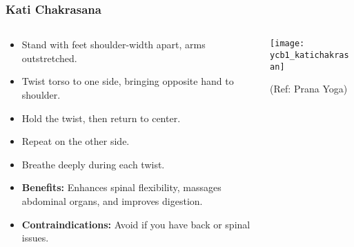 \begin{frame}[fragile]\frametitle{Kati Chakrasana}
\begin{columns}
    \begin{column}[T]{0.5\linewidth}
      \begin{itemize}
        \item Stand with feet shoulder-width apart, arms outstretched.
        \item Twist torso to one side, bringing opposite hand to shoulder.
        \item Hold the twist, then return to center.
        \item Repeat on the other side.
        \item Breathe deeply during each twist.
        \item \textbf{Benefits:} Enhances spinal flexibility, massages abdominal organs, and improves digestion.
        \item \textbf{Contraindications:} Avoid if you have back or spinal issues.
      \end{itemize}
    \end{column}
    \begin{column}[T]{0.5\linewidth}
        \begin{center}
        \begin{center}
		        \texttt{[image: ycb1\_katichakrasan]}
				
				{\tiny (Ref: Prana Yoga)}	        
		\end{center}   
        \end{center}    
    \end{column}
  \end{columns}
\end{frame}

